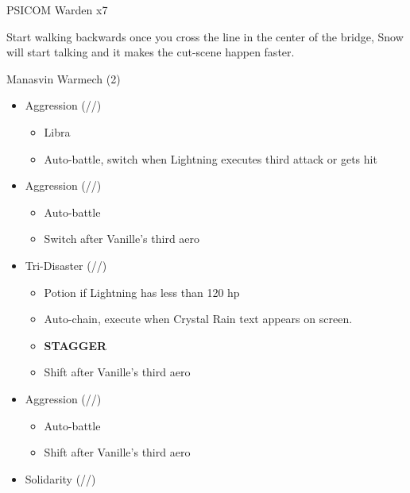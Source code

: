 \renewcommand{\first}{[1] Tri-Disaster (\rav/\rav/\rav)}

\renewcommand{\second}{[2] Solidarity (\com/\sen/\med)}

\renewcommand{\third}{[3] Aggression (\com/\com/\rav)}

\renewcommand{\fourth}{[4] Aggression (\com/\com/\rav)}

\begin{battle}{PSICOM Warden x7}
 
\end{battle}

Start walking backwards once you cross the line in the center of the bridge, Snow will start talking and it makes the cut-scene happen faster.

\begin{battle}{Manasvin Warmech (2)}
\begin{itemize}
    \item \third
    \begin{itemize}
        \item Libra
        \item Auto-battle, switch when Lightning executes third attack or gets hit
    \end{itemize}
    \item \fourth
    \begin{itemize}
        \item Auto-battle
        \item Switch after Vanille's third aero
    \end{itemize}
    \item \first
    \begin{itemize}
        \item Potion if Lightning has less than 120 hp
        \item Auto-chain, execute when Crystal Rain text appears on screen.
        \item \textbf{STAGGER}
        \item Shift after Vanille's third aero
    \end{itemize}
    \item \third
    \begin{itemize}
        \item Auto-battle
        \item Shift after Vanille's third aero
    \end{itemize}
    \item \second
    \begin{itemize}

\end{itemize}
\end{itemize}
\end{battle}
